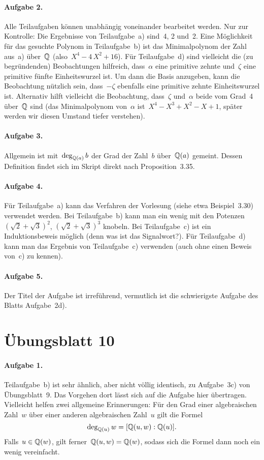 \documentclass{../algblatt}
\begin{document}
\paragraph{Aufgabe 2.} Alle Teilaufgaben 
können unabhängig voneinander bearbeitet werden. Nur zur Kontrolle: Die
Ergebnisse von Teilaufgabe~a) sind~4, 2 und~2. Eine Möglichkeit für das
gesuchte Polynom in Teilaufgabe~b) ist das Minimalpolynom der Zahl aus~a)
über~$\mathbb{Q}$ (also~$X^4-4\,X^2+16$). Für Teilaufgabe~d) sind vielleicht die (zu begründenden)
Beobachtungen hilfreich, dass~$\alpha$ eine primitive zehnte und~$\zeta$ eine
primitive fünfte Einheitswurzel ist. Um dann die Basis anzugeben, kann die
Beobachtung nützlich sein, dass~$-\zeta$ ebenfalls eine primitive zehnte
Einheitswurzel ist. Alternativ hilft vielleicht die Beobachtung, dass~$\zeta$
und~$\alpha$ beide vom Grad~4 über~$\mathbb{Q}$ sind (das Minimalpolynom von~$\alpha$
ist~$X^4 - X^3 + X^2 - X + 1$, später werden wir diesen Umstand tiefer
verstehen).

\paragraph{Aufgabe 3.} Allgemein ist mit~$\deg_{\mathbb{Q}(a)} b$ der Grad der
Zahl~$b$ über~$\mathbb{Q}(a)$ gemeint. Dessen Definition findet sich im Skript direkt
nach Proposition~3.35.

\paragraph{Aufgabe 4.} Für Teilaufgabe~a) kann das Verfahren der
Vorlesung (siehe etwa Beispiel~3.30) verwendet werden. Bei Teilaufgabe~b) kann
man ein wenig mit den Potenzen~$(\sqrt{2}+\sqrt{3})^2$, $(\sqrt{2}+\sqrt{3})^3$
knobeln. Bei Teilaufgabe~c) ist
ein Induktionsbeweis möglich (denn was ist das Signalwort?). Für Teilaufgabe~d) kann man
das Ergebnis von Teilaufgabe~c) verwenden (auch ohne einen Beweis von~c) zu
kennen).

\paragraph{Aufgabe 5.} Der Titel der Aufgabe ist irreführend, vermutlich ist
die schwierigste Aufgabe des Blatts Aufgabe~2d).


\section*{Übungsblatt 10}

\paragraph{Aufgabe 1.} Teilaufgabe~b) ist sehr ähnlich, aber nicht völlig
identisch, zu Aufgabe~3c) von Übungsblatt~9. Das Vorgehen dort lässt sich auf
die Aufgabe hier übertragen. Vielleicht helfen zwei allgemeine Erinnerungen:
Für den Grad einer algebraischen Zahl~$w$ über einer anderen algebraischen
Zahl~$u$ gilt die Formel
\[ \deg_{\mathbb{Q}(u)} w = [\mathbb{Q}(u,w):\mathbb{Q}(u)]. \]
Falls~$u \in \mathbb{Q}(w)$, gilt ferner~$\mathbb{Q}(u,w) = \mathbb{Q}(w)$, sodass sich die Formel
dann noch ein wenig vereinfacht.
\end{document}
